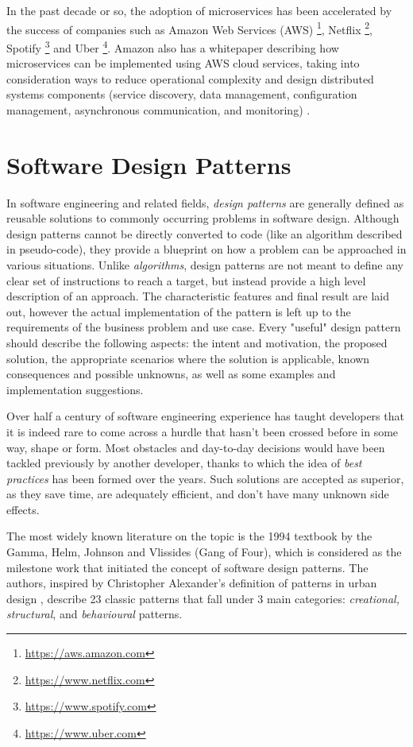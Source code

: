 In the past decade or so, the adoption of microservices has been accelerated by the success of companies such as Amazon Web Services (AWS) \footnote{\url{https://aws.amazon.com}}, Netflix \footnote{\url{https://www.netflix.com}}, Spotify \footnote{\url{https://www.spotify.com}} and Uber \footnote{\url{https://www.uber.com}}. Amazon also has a whitepaper describing how microservices can be implemented using AWS cloud services, taking into consideration ways to reduce operational complexity and design distributed systems components (service discovery, data management, configuration management, asynchronous communication, and monitoring) \cite{aws-microservices}.

\section{Software Design Patterns}

In software engineering and related fields, \textit{design patterns} are generally defined as reusable solutions to commonly occurring problems in software design. Although design patterns cannot be directly converted to code (like an algorithm described in pseudo-code), they provide a blueprint on how a problem can be approached in various situations. Unlike \textit{algorithms}, design patterns are not meant to define any clear set of instructions to reach a target, but instead provide a high level description of an approach. The characteristic features and final result are laid out, however the actual implementation of the pattern is left up to the requirements of the business problem and use case. Every "useful" design pattern should describe the following aspects: the intent and motivation, the proposed solution, the appropriate scenarios where the solution is applicable, known consequences and possible unknowns, as well as some examples and implementation suggestions.

Over half a century of software engineering experience has taught developers that it is indeed rare to come across a hurdle that hasn't been crossed before in some way, shape or form. Most obstacles and day-to-day decisions would have been tackled previously by another developer, thanks to which the idea of \textit{best practices} has been formed over the years. Such solutions are accepted as superior, as they save time, are adequately efficient, and don't have many unknown side effects.

The most widely known literature on the topic is the 1994 textbook \cite{gof94} by the Gamma, Helm, Johnson and Vlissides (Gang of Four), which is considered as the milestone work that initiated the concept of software design patterns. The authors, inspired by Christopher Alexander's definition of patterns in urban design \cite{alexander77}, describe 23 classic patterns that fall under 3 main categories: \textit{creational, structural}, and \textit{behavioural} patterns.

